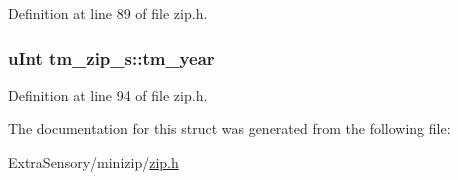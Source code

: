 Definition at line 89 of file zip.\+h.

\hypertarget{structtm__zip__s_ad58d60c6a536a0861dec11c6ef270753}{
\subsubsection[{tm\+\_\+year}]{\setlength{\rightskip}{0pt plus 5cm}u\+Int tm\+\_\+zip\+\_\+s\+::tm\+\_\+year}}\label{structtm__zip__s_ad58d60c6a536a0861dec11c6ef270753}


Definition at line 94 of file zip.\+h.



The documentation for this struct was generated from the following file\+:\begin{DoxyCompactItemize}
\item 
Extra\+Sensory/minizip/\hyperlink{zip_8h}{zip.\+h}\end{DoxyCompactItemize}
